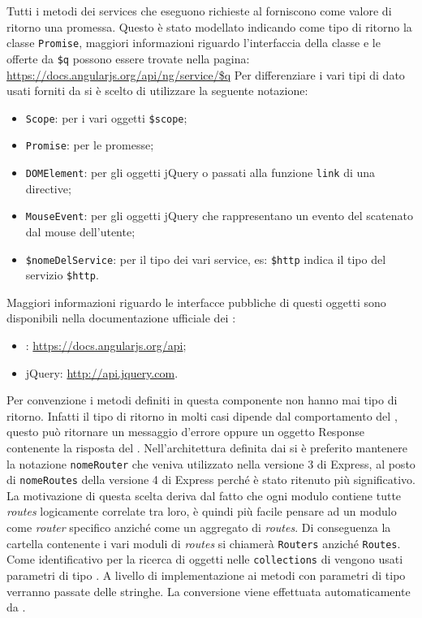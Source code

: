 Tutti i metodi dei services che eseguono richieste al  forniscono come valore di ritorno una promessa. Questo è stato modellato indicando come tipo di ritorno la classe \texttt{Promise}, maggiori informazioni riguardo l'interfaccia della classe e le  offerte da \texttt{\$q} possono essere trovate nella pagina: \url{https://docs.angularjs.org/api/ng/service/$q}%
Per differenziare i vari tipi di dato usati forniti da  si è scelto di utilizzare la seguente notazione:
\begin{itemize}
\item \texttt{Scope}: per i vari oggetti \texttt{\$scope};
\item \texttt{Promise}: per le promesse;
\item \texttt{DOMElement}: per gli oggetti jQuery o  passati alla funzione \texttt{link} di una directive;
\item \texttt{MouseEvent}: per gli oggetti jQuery che rappresentano un evento del  scatenato dal mouse dell'utente;
\item \texttt{\$nomeDelService}: per il tipo dei vari service, es: \texttt{\$http} indica il tipo del servizio \texttt{\$http}.
\end{itemize}
Maggiori informazioni riguardo le interfacce pubbliche di questi oggetti sono disponibili nella documentazione ufficiale dei :
\begin{itemize}
\item {}: \url{https://docs.angularjs.org/api};
\item jQuery: \url{http://api.jquery.com}.
\end{itemize}
Per convenzione i metodi definiti in questa componente non hanno mai tipo di ritorno. Infatti il tipo di ritorno in molti casi dipende dal comportamento  del , questo può ritornare un messaggio d'errore oppure un oggetto Response contenente la risposta del .
Nell'architettura definita dai \rPs si è preferito mantenere la notazione \texttt{nomeRouter} che veniva utilizzato nella versione 3 di Express, al posto di \texttt{nomeRoutes} della versione 4 di Express perché è stato ritenuto più significativo.
La motivazione di questa scelta deriva dal fatto che ogni modulo contiene tutte \textit{routes} logicamente correlate tra loro, è quindi più facile pensare ad un modulo come \textit{router} specifico anziché come un  aggregato di \textit{routes}.
Di conseguenza la cartella contenente i vari moduli di \textit{routes} si chiamerà \texttt{Routers} anziché \texttt{Routes}.
Come identificativo per la ricerca di oggetti nelle \texttt{collections} di  vengono usati parametri di tipo \texttt{}. A livello di implementazione ai metodi con parametri di tipo \texttt{} verranno passate delle stringhe. La conversione viene effettuata automaticamente da .
